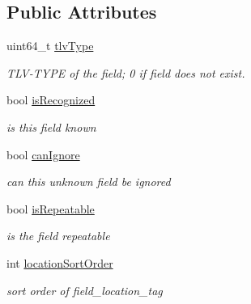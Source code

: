 \subsection*{Public Attributes}
\begin{DoxyCompactItemize}
\item 
uint64\+\_\+t \hyperlink{classndn_1_1lp_1_1detail_1_1FieldInfo_a3c424657b49947f2fa1fc6ee368291dc}{tlv\+Type}\hypertarget{classndn_1_1lp_1_1detail_1_1FieldInfo_a3c424657b49947f2fa1fc6ee368291dc}{}\label{classndn_1_1lp_1_1detail_1_1FieldInfo_a3c424657b49947f2fa1fc6ee368291dc}

\begin{DoxyCompactList}\small\item\em T\+L\+V-\/\+T\+Y\+PE of the field; 0 if field does not exist. \end{DoxyCompactList}\item 
bool \hyperlink{classndn_1_1lp_1_1detail_1_1FieldInfo_aad01ddb6186cfa5e906ab2e420d7fe2b}{is\+Recognized}\hypertarget{classndn_1_1lp_1_1detail_1_1FieldInfo_aad01ddb6186cfa5e906ab2e420d7fe2b}{}\label{classndn_1_1lp_1_1detail_1_1FieldInfo_aad01ddb6186cfa5e906ab2e420d7fe2b}

\begin{DoxyCompactList}\small\item\em is this field known \end{DoxyCompactList}\item 
bool \hyperlink{classndn_1_1lp_1_1detail_1_1FieldInfo_a2b6848ff589e37705ededae0ad826e36}{can\+Ignore}\hypertarget{classndn_1_1lp_1_1detail_1_1FieldInfo_a2b6848ff589e37705ededae0ad826e36}{}\label{classndn_1_1lp_1_1detail_1_1FieldInfo_a2b6848ff589e37705ededae0ad826e36}

\begin{DoxyCompactList}\small\item\em can this unknown field be ignored \end{DoxyCompactList}\item 
bool \hyperlink{classndn_1_1lp_1_1detail_1_1FieldInfo_a4173ab9e47c8dc53f868bd8fc9abcae6}{is\+Repeatable}\hypertarget{classndn_1_1lp_1_1detail_1_1FieldInfo_a4173ab9e47c8dc53f868bd8fc9abcae6}{}\label{classndn_1_1lp_1_1detail_1_1FieldInfo_a4173ab9e47c8dc53f868bd8fc9abcae6}

\begin{DoxyCompactList}\small\item\em is the field repeatable \end{DoxyCompactList}\item 
int \hyperlink{classndn_1_1lp_1_1detail_1_1FieldInfo_ae29b1cb02a73c9a7e7cdc3565ff6e28d}{location\+Sort\+Order}\hypertarget{classndn_1_1lp_1_1detail_1_1FieldInfo_ae29b1cb02a73c9a7e7cdc3565ff6e28d}{}\label{classndn_1_1lp_1_1detail_1_1FieldInfo_ae29b1cb02a73c9a7e7cdc3565ff6e28d}

\begin{DoxyCompactList}\small\item\em sort order of field\+\_\+location\+\_\+tag \end{DoxyCompactList}\end{DoxyCompactItemize}


